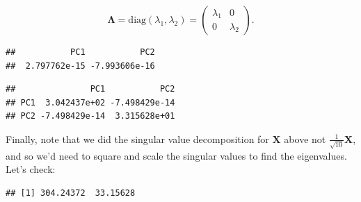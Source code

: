 \documentclass[
]{book}
\newenvironment{Shaded}{\begin{snugshade}}{\end{snugshade}}
\newcommand{\CommentTok}[1]{\textcolor[rgb]{0.56,0.35,0.01}{\textit{#1}}}
\newcommand{\DecValTok}[1]{\textcolor[rgb]{0.00,0.00,0.81}{#1}}
\newcommand{\FunctionTok}[1]{\textcolor[rgb]{0.13,0.29,0.53}{\textbf{#1}}}
\newcommand{\NormalTok}[1]{#1}
\newcommand{\SpecialCharTok}[1]{\textcolor[rgb]{0.81,0.36,0.00}{\textbf{#1}}}
\theoremstyle{definition}
\theoremstyle{definition}
\theoremstyle{definition}
\theoremstyle{definition}
\theoremstyle{remark}
\begin{document}
\[
\boldsymbol \Lambda= \text{diag}(\lambda_1,\lambda_2) =  \begin{pmatrix} \lambda_1 & 0 \\ 0 & \lambda_2 \end{pmatrix}.
\]

\begin{Shaded}
\end{Shaded}

\begin{verbatim}
##           PC1           PC2 
##  2.797762e-15 -7.993606e-16
\end{verbatim}

\begin{Shaded}
\end{Shaded}

\begin{verbatim}
##               PC1           PC2
## PC1  3.042437e+02 -7.498429e-14
## PC2 -7.498429e-14  3.315628e+01
\end{verbatim}

Finally, note that we did the singular value decomposition for \(\mathbf X\) above not \(\frac{1}{\sqrt{10}}\mathbf X\), and so we'd need to square and scale the singular values to find the eigenvalues. Let's check:

\begin{Shaded}
\end{Shaded}

\begin{verbatim}
## [1] 304.24372  33.15628
\end{verbatim}

\begin{Shaded}
\end{Shaded}
\end{document}

